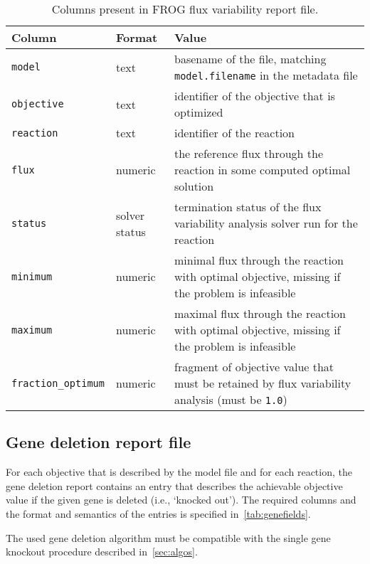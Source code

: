 

\begin{table}\tablefont
\begin{tabular}{llp{30em}}
\toprule
Column & Format & Value \\
\midrule
\verb|model|
 & text
 & basename of the file, matching \verb|model.filename| in the metadata file
 \\
\verb|objective|
 & text
 & identifier of the objective that is optimized
 \\
\verb|reaction|
 & text
 & identifier of the reaction
 \\
\verb|flux|
 & numeric
 & the reference flux through the reaction in some computed optimal solution
 \\
\verb|status|
 & solver status
 & termination status of the flux variability analysis solver run for the reaction
 \\
\verb|minimum|
 & numeric
 & minimal flux through the reaction with optimal objective, missing if the problem is infeasible
 \\
\verb|maximum|
 & numeric
 & maximal flux through the reaction with optimal objective, missing if the problem is infeasible
 \\
\verb|fraction_optimum|
 & numeric
 & fragment of objective value that must be retained by flux variability analysis (must be \verb|1.0|)
 \\
\bottomrule
\end{tabular}
\caption{Columns present in FROG flux variability report file.}
\label{tab:fvafields}
\end{table}

\subsection{Gene deletion report file}
\label{sec:genes}

For each objective that is described by the model file and for each reaction, the gene deletion report contains an entry that describes the achievable objective value if the given gene is deleted (i.e., `knocked out'). The required columns and the format and semantics of the entries is specified in~\cref{tab:genefields}.

The used gene deletion algorithm must be compatible with the single gene knockout procedure described in~\cref{sec:algos}.

